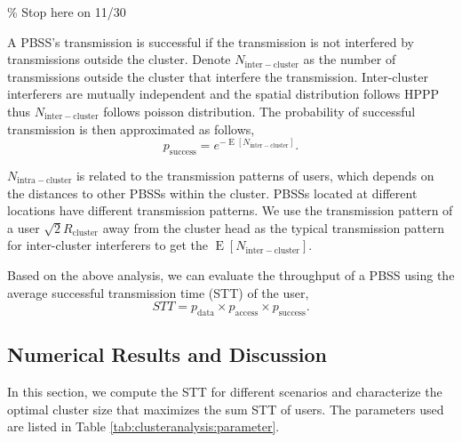 \documentclass[10pt, conference, letterpaper]{IEEEtran}
\DeclareMathOperator*{\E}{\mathrm{E}}
\begin{document}
\% Stop here on 11/30

A PBSS's transmission is successful if the transmission is not interfered by transmissions outside the cluster. Denote $N_{\mathrm{inter-cluster}}$ as the number of transmissions outside the cluster that interfere the transmission. Inter-cluster interferers are mutually independent and the spatial distribution follows HPPP thus $N_{\mathrm{inter-cluster}}$ follows poisson distribution. The probability of successful transmission is then approximated as follows, 
\begin{equation*}
p_{\mathrm{success}} = e^{-\E[N_{\mathrm{inter-cluster}}]}.
\end{equation*} 

$N_{\mathrm{intra-cluster}}$ is related to the transmission patterns of users, which depends on the distances to other PBSSs within the cluster. PBSSs located at different locations have different transmission patterns. We use the transmission pattern of a user $\sqrt{2}R_{\mathrm{cluster}}$ away from the cluster head as the typical transmission pattern for inter-cluster interferers to get the $\E[N_{\mathrm{inter-cluster}}]$.

Based on the above analysis, we can evaluate the throughput of a PBSS using the average successful transmission time (STT) of the user,
\begin{equation*}
STT = p_{\mathrm{data}}\times p_{\mathrm{access}} \times p_{\mathrm{success}}.
\end{equation*}

\subsection{Numerical Results and Discussion}
In this section, we compute the STT for different scenarios and characterize the optimal cluster size that maximizes the sum STT of users. 
The parameters used are listed in Table \ref{tab:clusteranalysis:parameter}.
\end{document}
